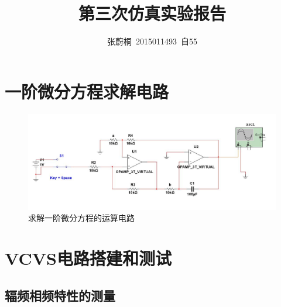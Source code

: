 \documentclass[UTF8,a4paper]{paper}
\title{第三次仿真实验报告}
\author{张蔚桐\ 2015011493\ 自55}
\begin{document}
\newcommand{\tabincell}[2]{\begin{tabular}{@{}#1@{}}#2\end{tabular}}
\maketitle
\tableofcontents
\clearpage
\section{一阶微分方程求解电路}
\begin{figure}
\centering
\includegraphics[width=\textwidth]{cir1.jpg}
\caption{求解一阶微分方程的运算电路}
\label{cir1}
\end{figure}
\section{VCVS电路搭建和测试}
\subsection{辐频相频特性的测量}
\end{document}

